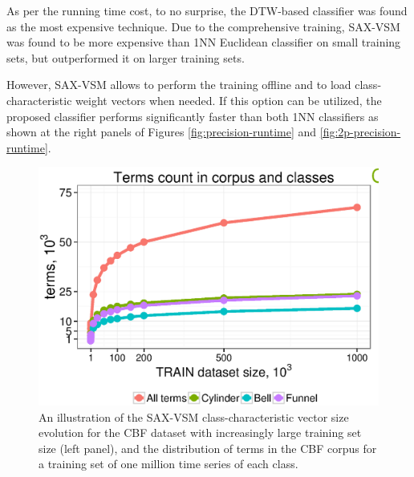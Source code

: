 As per the running time cost, to no surprise, the DTW-based classifier was found as the most expensive technique. 
Due to the comprehensive training, SAX-VSM was found to be more expensive than 1NN Euclidean 
classifier on small training sets, but outperformed it on larger training sets.

However, SAX-VSM allows to perform the training offline and to load class-characteristic \tfidf weight vectors when needed. 
If this option can be utilized, the proposed classifier performs significantly faster than both 1NN classifiers as 
shown at the right panels of Figures \ref{fig:precision-runtime} and \ref{fig:2p-precision-runtime}.

\begin{figure}[t]
   \centering
   \includegraphics[width=140mm]{figures/words-cbf.ps}
   \caption{An illustration of the SAX-VSM class-characteristic vector size evolution for the CBF dataset 
   with increasingly large training set size (left panel), and the distribution of terms in the CBF corpus for 
   a training set of one million time series of each class.}
   \label{fig:venn-cbf}


\end{figure}
